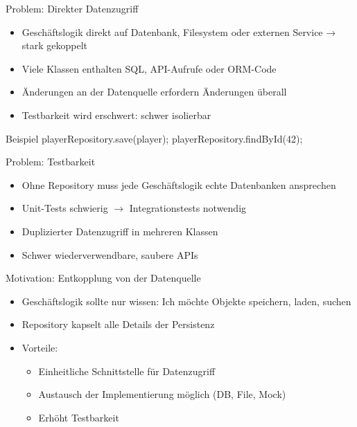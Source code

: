 \begin{frame}{Problem: Direkter Datenzugriff}
    \begin{itemize}
        \item Geschäftslogik direkt auf Datenbank, Filesystem oder externen Service → stark gekoppelt
        \item Viele Klassen enthalten SQL, API-Aufrufe oder ORM-Code
        \item Änderungen an der Datenquelle erfordern Änderungen überall
        \item Testbarkeit wird erschwert: schwer isolierbar
    \end{itemize}
    \pause
    \begin{alertblock}{Beispiel}
        playerRepository.save(player);
        playerRepository.findById(42);
    \end{alertblock}
\end{frame}

\begin{frame}{Problem: Testbarkeit}
    \begin{itemize}
        \item Ohne Repository muss jede Geschäftslogik echte Datenbanken ansprechen
        \item Unit-Tests schwierig $\rightarrow$ Integrationstests notwendig
        \item Duplizierter Datenzugriff in mehreren Klassen
        \item Schwer wiederverwendbare, saubere APIs
    \end{itemize}
\end{frame}

\begin{frame}{Motivation: Entkopplung von der Datenquelle}
    \begin{itemize}
        \item Geschäftslogik sollte nur wissen: Ich möchte Objekte speichern, laden, suchen
        \item Repository kapselt alle Details der Persistenz
        \item Vorteile:
        \begin{itemize}
            \item Einheitliche Schnittstelle für Datenzugriff
            \item Austausch der Implementierung möglich (DB, File, Mock)
            \item Erhöht Testbarkeit
        \end{itemize}
    \end{itemize}
\end{frame}
